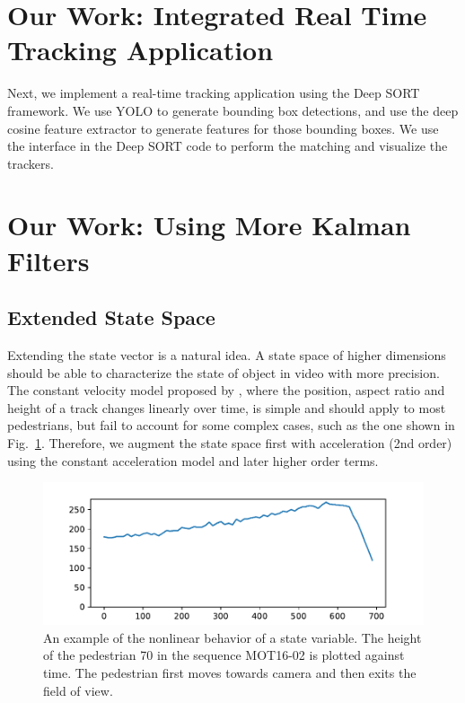 \documentclass[conference]{IEEEtran}
\begin{document}
\section{Our Work: Integrated Real Time Tracking Application}
Next, we implement a real-time tracking application using the Deep SORT framework.
We use YOLO to generate bounding box detections, and use the deep cosine feature extractor to generate features for those bounding boxes.
We use the interface in the Deep SORT code to perform the matching and visualize the trackers.

\section{Our Work: Using More Kalman Filters}
\label{sec:our-work}
\subsection{Extended State Space}

Extending the state vector is a natural idea. A state space of higher dimensions should be able to characterize the state of object in video with more precision. The constant velocity model proposed by \cite{Wojke2017simple}, where the position, aspect ratio and height of a track changes linearly over time, is simple and should apply to most pedestrians, but fail to account for some complex cases, such as the one shown in Fig.~\ref{fig:example-of-nonlinearity}. Therefore, we augment the state space first with acceleration (2nd order) using the constant acceleration model and later higher order terms.

\begin{figure}[h]
    \centering
    \includegraphics[width=\linewidth]{fig/accelerating-pedestrian-height-plot.pdf}
    \caption{An example of the nonlinear behavior of a state variable. The height of the pedestrian 70 in the sequence MOT16-02 is plotted against time. The pedestrian first moves towards camera and then exits the field of view.}
    \label{fig:example-of-nonlinearity}
\end{figure}
\end{document}
